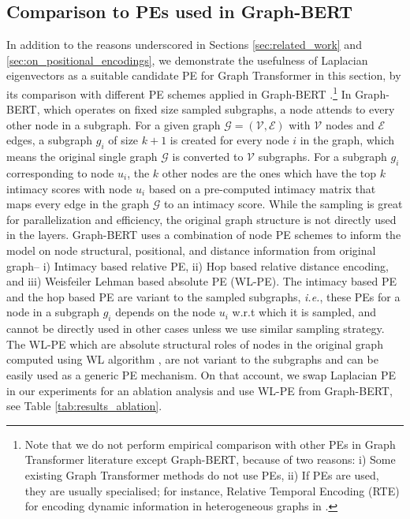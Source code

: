 \documentclass[letterpaper]{article} %
\begin{document}
\subsection{Comparison to PEs used in Graph-BERT}
In addition to the 
reasons underscored in Sections \ref{sec:related_work} and \ref{sec:on_positional_encodings}, we demonstrate the usefulness of Laplacian eigenvectors as a suitable candidate PE for Graph Transformer in this section, by its comparison with different PE schemes applied in Graph-BERT \cite{zhang2020graph}.\footnote{Note that we do not perform empirical comparison with other PEs in Graph Transformer literature except Graph-BERT, because of two reasons: i) Some existing Graph Transformer methods do not use PEs, ii) If PEs are used, they are usually specialised; for instance, Relative Temporal Encoding (RTE) for encoding dynamic information in heterogeneous graphs in \cite{hu2020heterogeneous}.} In Graph-BERT, which operates on fixed size sampled subgraphs, a node attends to every other node in a subgraph. 
For a given graph $\mathcal{G}=(\mathcal{V},\mathcal{E})$ with $\mathcal{V}$ nodes and $\mathcal{E}$ edges, a subgraph $g_i$ of size $k+1$ is created for every node $i$ in the graph, which means the original single graph $\mathcal{G}$ is converted to $\mathcal{V}$ subgraphs. For a subgraph $g_i$ corresponding to node $u_i$, the $k$ other nodes are the ones which have the top $k$ intimacy scores with node $u_i$ based on a pre-computed intimacy matrix that maps every edge in the graph $\mathcal{G}$ to an intimacy score.
While the sampling is great for parallelization and efficiency, the original graph structure is not directly used in the layers. Graph-BERT uses a combination of node PE schemes to inform the model on node structural, positional, and distance information from original graph-- i) Intimacy based relative PE, ii) Hop based relative distance encoding, and iii) Weisfeiler Lehman based absolute PE (WL-PE). The intimacy based PE and the hop based PE are variant to the sampled subgraphs, \textit{i.e.}, these PEs for a node in a subgraph $g_i$ depends on the node $u_i$ w.r.t which it is sampled, and cannot be directly used in other cases unless we use similar sampling strategy. The WL-PE which are absolute structural roles of nodes in the original graph computed using WL algorithm \cite{zhang2020graph, niepert2016learning}, are not variant to the subgraphs and can be easily used as a generic PE mechanism. On that account, we swap Laplacian PE in our experiments for an ablation analysis and use WL-PE from Graph-BERT, see Table \ref{tab:results_ablation}.
\end{document}
